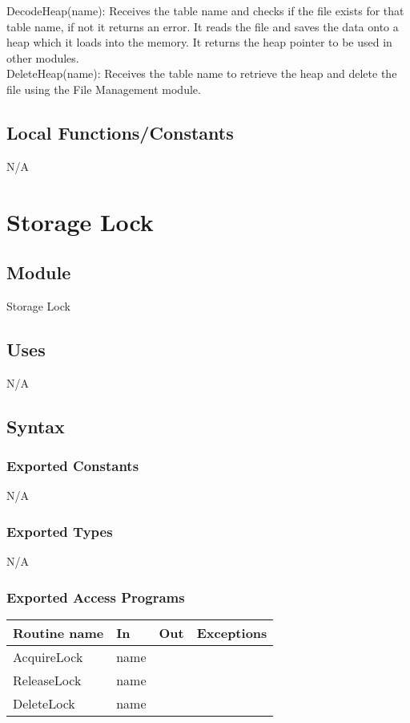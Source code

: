 \documentclass[12pt]{article}
\begin{document}
\noindent DecodeHeap(name): Receives the table name and checks if the file exists for that table name, if not it returns an error. It reads the file and saves the data onto a heap which it loads into the memory. It returns the heap pointer to be used in other modules. \\ 

\noindent DeleteHeap(name): Receives the table name to retrieve the heap and delete the file using the File Management module. \\

\subsection{Local Functions/Constants}
N/A

\newpage

\section{Storage Lock}

\subsection{Module}
Storage Lock

\subsection{Uses}
N/A

\subsection{Syntax}
\subsubsection{Exported Constants}
N/A

\subsubsection{Exported Types}
N/A

\subsubsection{Exported Access Programs}
\begin{tabular}{| l | l | l | l |}
\hline
\textbf{Routine name} & \textbf{In} & \textbf{Out} & \textbf{Exceptions}\\
\hline
AcquireLock & name &  & \\
\hline
ReleaseLock & name &  & \\
\hline
DeleteLock & name &  & \\
\hline
\end{tabular}
\end{document}
